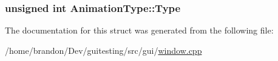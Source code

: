 \hypertarget{struct_animation_type_7949813aa1e5cb2319509acfdaf413e4}{
\subsubsection[{Type}]{\setlength{\rightskip}{0pt plus 5cm}unsigned int {\bf AnimationType::Type}}}
\label{struct_animation_type_7949813aa1e5cb2319509acfdaf413e4}




The documentation for this struct was generated from the following file:\begin{CompactItemize}
\item 
/home/brandon/Dev/guitesting/src/gui/\hyperlink{window_8cpp}{window.cpp}\end{CompactItemize}
